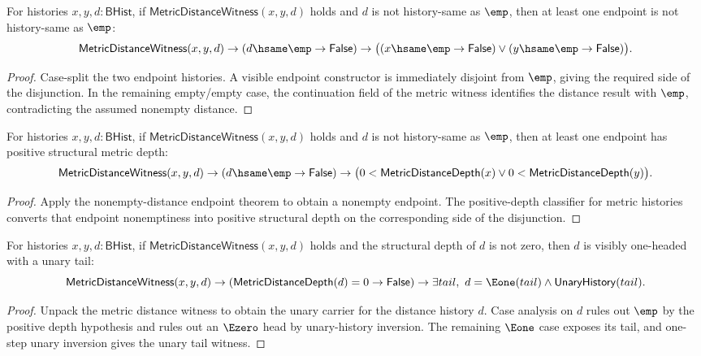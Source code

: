 \begin{theorem}
\label{thm:metric-distance-witness-nonempty-distance-endpoint-nonempty}
For histories $x,y,d:\mathsf{BHist}$, if
$\mathsf{MetricDistanceWitness}(x,y,d)$ holds and $d$ is not history-same as
$\emp$, then at least one endpoint is not history-same as $\emp$:
$$
\mathsf{MetricDistanceWitness}(x,y,d)\to
(d\hsame\emp\to\mathsf{False})\to
\bigl((x\hsame\emp\to\mathsf{False})
\vee (y\hsame\emp\to\mathsf{False})\bigr).
$$
\end{theorem}
\begin{proof}
Case-split the two endpoint histories. A visible endpoint constructor is
immediately disjoint from $\emp$, giving the required side of the disjunction.
In the remaining empty/empty case, the continuation field of the metric witness
identifies the distance result with $\emp$, contradicting the assumed
nonempty distance.
\end{proof}

\begin{theorem}
\label{thm:metric-distance-witness-nonempty-distance-endpoint-positive-depth}
For histories $x,y,d:\mathsf{BHist}$, if
$\mathsf{MetricDistanceWitness}(x,y,d)$ holds and $d$ is not history-same as
$\emp$, then at least one endpoint has positive structural metric depth:
$$
\mathsf{MetricDistanceWitness}(x,y,d)\to
(d\hsame\emp\to\mathsf{False})\to
\bigl(0<\mathsf{MetricDistanceDepth}(x)
\vee 0<\mathsf{MetricDistanceDepth}(y)\bigr).
$$
\end{theorem}
\begin{proof}
Apply the nonempty-distance endpoint theorem to obtain a nonempty endpoint.
The positive-depth classifier for metric histories converts that endpoint
nonemptiness into positive structural depth on the corresponding side of the
disjunction.
\end{proof}

\begin{theorem}
\label{thm:metric-distance-witness-positive-distance-e1-shape}
For histories $x,y,d:\mathsf{BHist}$, if
$\mathsf{MetricDistanceWitness}(x,y,d)$ holds and the structural depth of
$d$ is not zero, then $d$ is visibly one-headed with a unary tail:
$$
\mathsf{MetricDistanceWitness}(x,y,d)\to
(\mathsf{MetricDistanceDepth}(d)=0\to\mathsf{False})\to
\exists tail,\ d=\Eone(tail)\wedge\mathsf{UnaryHistory}(tail).
$$
\end{theorem}
\begin{proof}
Unpack the metric distance witness to obtain the unary carrier for the
distance history $d$. Case analysis on $d$ rules out $\emp$ by the positive
depth hypothesis and rules out an $\Ezero$ head by unary-history inversion.
The remaining $\Eone$ case exposes its tail, and one-step unary inversion gives
the unary tail witness.
\end{proof}

